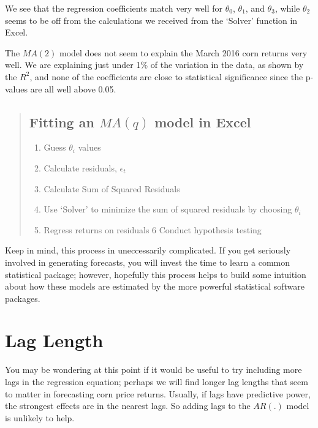 \documentclass[
  letterpaper,
  DIV=11,
  numbers=noendperiod]{scrreprt}
\providecommand{\tightlist}{%
  \setlength{\itemsep}{0pt}\setlength{\parskip}{0pt}}\usepackage{longtable,booktabs,array}
\begin{document}
We see that the regression coefficients match very well for
\(\theta_0\), \(\theta_1\), and \(\theta_3\), while \(\theta_2\) seems
to be off from the calculations we received from the `Solver' function
in Excel.

The \(MA(2)\) model does not seem to explain the March 2016 corn returns
very well. We are explaining just under 1\% of the variation in the
data, as shown by the \(R^2\), and none of the coefficients are close to
statistical significance since the p-values are all well above 0.05.

\begin{quote}
\hypertarget{fitting-an-maq-model-in-excel}{%
\subsection{\texorpdfstring{Fitting an \(MA(q)\) model in
Excel}{Fitting an MA(q) model in Excel}}\label{fitting-an-maq-model-in-excel}}

\begin{enumerate}
\def\labelenumi{\arabic{enumi}.}
\tightlist
\item
  Guess \(\theta_i\) values
\item
  Calculate residuals, \(\epsilon_t\)
\item
  Calculate Sum of Squared Residuals
\item
  Use `Solver' to minimize the sum of squared residuals by choosing
  \(\theta_i\)
\item
  Regress returns on residuals 6 Conduct hypothesis testing
\end{enumerate}
\end{quote}

Keep in mind, this process in uneccessarily complicated. If you get
seriously involved in generating forecasts, you will invest the time to
learn a common statistical package; however, hopefully this process
helps to build some intuition about how these models are estimated by
the more powerful statistical software packages.

\hypertarget{lag-length}{%
\section{Lag Length}\label{lag-length}}

You may be wondering at this point if it would be useful to try
including more lags in the regression equation; perhaps we will find
longer lag lengths that seem to matter in forecasting corn price
returns. Usually, if lags have predictive power, the strongest effects
are in the nearest lags. So adding lags to the \(AR(.)\) model is
unlikely to help.
\end{document}
